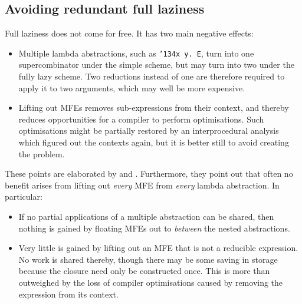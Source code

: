 \subsection{Avoiding redundant full laziness}
\label{sect:redundant}

Full laziness does not come for free.  It has two main negative effects:
\begin{itemize}
\item
Multiple lambda abstractions, such as \mbox{\tt {\char'134}x\ y.\ E}, turn into one
supercombinator under the simple scheme, but may turn into
two under the fully lazy
scheme.  Two reductions instead of one are therefore required to apply
it to two arguments, which may well be more expensive.
\item
Lifting out MFEs removes sub-expressions from their context, and
thereby
reduces opportunities for a compiler to perform optimisations.  Such
optimisations might be partially restored by an interprocedural analysis
which figured out the contexts again, but it is better still to avoid
creating the problem.
\end{itemize}

These points are elaborated by \cite{FairbairnRedundant} and
\cite{GoldbergThesis}.  Furthermore, they point out that often no
benefit arises from lifting out {\em every\/} MFE from {\em every\/}
lambda abstraction.  In particular:

\begin{itemize}
\item
If no partial applications of a multiple abstraction can be shared,
then nothing is gained by floating MFEs out to {\em between\/} the
nested abstractions.

\item
Very little is gained by lifting out an MFE that is not a reducible
expression.  No work is shared thereby, though there may be some
saving in storage because the closure need only be constructed once.
This is more than outweighed by the loss of compiler optimisations
caused by removing the expression from its context.
\end{itemize}

